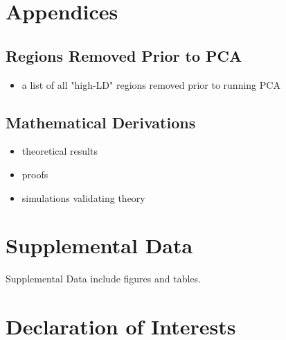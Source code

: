 \documentclass[12pt]{article}
\newcommand{\add}[1]{{\color{red}{[... #1 ...]}}}
\begin{document}




\newpage
\section{Appendices}


\subsection{Regions Removed Prior to PCA}

\begin{itemize}
\item a list of all "high-LD" regions removed prior to running PCA
\end{itemize}

\subsection{Mathematical Derivations}

\begin{itemize}
\item theoretical results
\item proofs
\item simulations validating theory
\end{itemize}


\newpage
\section*{Supplemental Data}


Supplemental Data include \add{??} figures and \add{??} tables.



\section*{Declaration of Interests}

\end{document}
